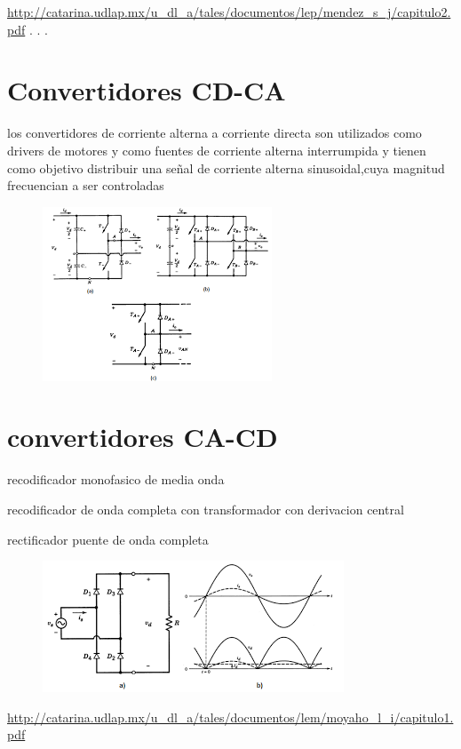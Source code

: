 \documentclass[11pt]{article}
\begin{document}
\url{http://catarina.udlap.mx/u_dl_a/tales/documentos/lep/mendez_s_j/capitulo2.pdf}
.
.
.
\section{Convertidores CD-CA}
los convertidores de corriente alterna a corriente directa son utilizados como drivers de motores y como fuentes de corriente alterna interrumpida y tienen como objetivo distribuir una señal de corriente alterna sinusoidal,cuya magnitud frecuencian a ser controladas 

\begin{figure}[htp]
\centering
\includegraphics[scale=1.00]{images.png}
\caption{}
\label{}
\end{figure}




\section{convertidores CA-CD}

recodificador monofasico de media onda         

recodificador de onda completa con transformador con derivacion central

rectificador puente de onda completa
\begin{figure}[htp]
\centering
\includegraphics[scale=1.00]{descarga.png}
\caption{}
\label{}
\end{figure}

\url{http://catarina.udlap.mx/u_dl_a/tales/documentos/lem/moyaho_l_i/capitulo1.pdf}
\end{document}
